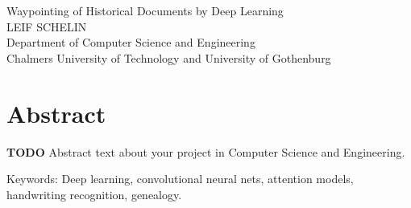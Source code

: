 
Waypointing of Historical Documents by Deep Learning\\
LEIF SCHELIN\\
Department of Computer Science and Engineering\\
Chalmers University of Technology and University of Gothenburg\setlength{\parskip}{0.5cm}

\thispagestyle{plain}			%
\section*{Abstract}
\textbf{TODO}
Abstract text about your project in  Computer Science and Engineering.

\vfill
Keywords: Deep learning, convolutional neural nets, attention models, handwriting recognition, genealogy.

\newpage				%
\thispagestyle{empty}
\mbox{}

